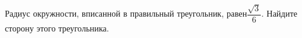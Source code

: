 \begin{ex}
	\begin{condition}
		Радиус окружности, вписанной в правильный треугольник, равен\( \dfrac{\sqrt{3}}{6} \).  Найдите сторону этого треугольника.
	\end{condition}
\end{ex}